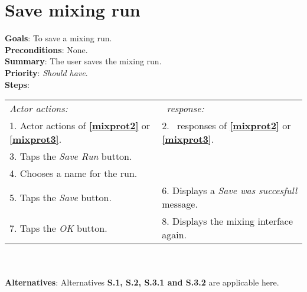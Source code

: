      \section{Save mixing run}
  \label{saverun}
  \textbf{Goals}: To save a mixing run.\\
  \textbf{Preconditions}: None. \\
  \textbf{Summary}: The user saves the mixing run.\\
  \textbf{Priority}: \emph{Should have}.\\
  \textbf{Steps}: \\
  \begin{tabular}{ p{} p{} }
  	\emph{Actor actions:} & \emph{\projectname\ response:} \\
  	1. Actor actions of \textbf{\ref{mixprot2}} or \textbf{\ref{mixprot3}}. & 2. \projectname\ responses of \textbf{\ref{mixprot2}} or \textbf{\ref{mixprot3}}. \\
    3. Taps the \emph{Save Run} button.  & \\
    4. Chooses a name for the run. & \\
    5. Taps the \emph{Save} button. & 6. Displays a \emph{Save was succesfull} message.\\
    7. Taps the \emph{OK} button. & 8. Displays the mixing interface again. \\
      \end{tabular}
    	 \\
    \\\textbf{Alternatives}: Alternatives \textbf{S.1, S.2, S.3.1 and S.3.2} are applicable here.
    
